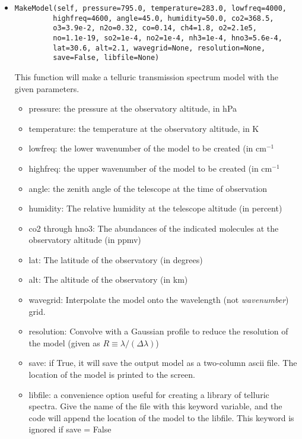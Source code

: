 \documentclass{article}
\begin{document}
\begin{itemize}
  \item \begin{Verbatim}[commandchars=\\\{\}]
MakeModel(self, pressure=795.0, temperature=283.0, lowfreq=4000,
         highfreq=4600, angle=45.0, humidity=50.0, co2=368.5,
         o3=3.9e-2, n2o=0.32, co=0.14, ch4=1.8, o2=2.1e5, 
         no=1.1e-19, so2=1e-4, no2=1e-4, nh3=1e-4, hno3=5.6e-4,
         lat=30.6, alt=2.1, wavegrid=None, resolution=None, 
         save=False, libfile=None)
    \end{Verbatim}
   This function will make a telluric transmission spectrum model with the given parameters.
   
   \begin{itemize}
     
     \item pressure: the pressure at the observatory altitude, in hPa
     \item temperature: the temperature at the observatory altitude, in K
     \item lowfreq: the lower wavenumber of the model to be created (in cm$^{-1}$
     \item highfreq: the upper wavenumber of the model to be created (in cm$^{-1}$
     \item angle: the zenith angle of the telescope at the time of observation
     \item humidity: The relative humidity at the telescope altitude (in percent)
     \item co2 through hno3: The abundances of the indicated molecules at the observatory altitude (in ppmv)
     \item lat: The latitude of the observatory (in degrees)
     \item alt: The altitude of the observatory (in km)
     \item wavegrid: Interpolate the model onto the wavelength (not \emph{wavenumber}) grid.
     \item resolution: Convolve with a Gaussian profile to reduce the resolution of the model (given as $R\equiv \lambda/(\Delta \lambda)$)
     \item save: if True, it will save the output model as a two-column ascii file. The location of the model is printed to the screen.
     \item libfile: a convenience option useful for creating a library of telluric spectra. Give the name of the file with this keyword variable, and the code will append the location of the model to the libfile. This keyword is ignored if save = False
     
     
   \end{itemize}
   
   
\end{itemize}
\end{document}
